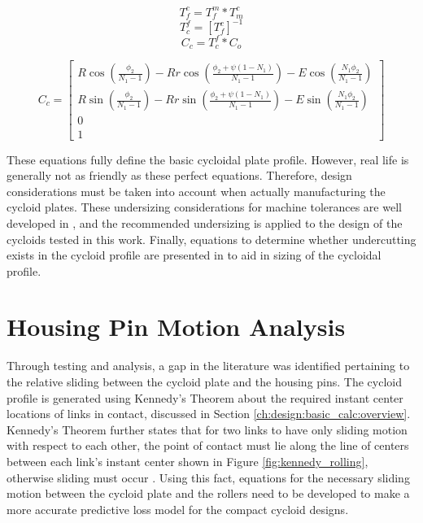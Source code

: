 \begin{equation} \label{eq:T_fc}
T_f^c = T_f^m * T_m^c 
\end{equation}
\begin{equation} \label{eq:T_cf}
T_c^f = \left[{T_f^c}\right]^{-1}
\end{equation}
\begin{equation} \label{eq:Cc}
C_c = T_c^f * C_o
\end{equation}

\begin{equation} \label{eq:single_profile}
C_c = \left[\begin{array}{c}
		R\cos(\frac{\phi_2}{N_1 -1}) - Rr\cos(\frac{\phi_2 + \psi(1-N_1)}{N_1-1}) - E\cos(\frac{N_1\phi_2}{N_1-1})\\
		R\sin(\frac{\phi_2}{N_1 -1}) - Rr\sin(\frac{\phi_2 + \psi(1-N_1)}{N_1-1}) - E\sin(\frac{N_1\phi_2}{N_1-1})\\
		0\\
		1
		\end{array} \right]
\end{equation}

These equations fully define the basic cycloidal plate profile. However, real life is generally not as friendly as these perfect equations. Therefore, design considerations must be taken into account when actually manufacturing the cycloid plates. These undersizing considerations for machine tolerances are well developed in \cite{ref:design_and_application}, and the recommended undersizing is applied to the design of the cycloids tested in this work. Finally, equations to determine whether undercutting exists in the cycloid profile are presented in \cite{ref:ye} to aid in sizing of the cycloidal profile. 




\section{Housing Pin Motion Analysis} \label{ch:design:pin_roll_1s}

Through testing and analysis, a gap in the literature was identified pertaining to the relative sliding between the cycloid plate and the housing pins. The cycloid profile is generated using Kennedy's Theorem about the required instant center locations of links in contact, discussed in Section \ref{ch:design:basic_calc:overview}. Kennedy's Theorem further states that for two links to have only sliding motion with respect to each other, the point of contact must lie along the line of centers between each link's instant center shown in Figure \ref{fig:kennedy_rolling}, otherwise sliding must occur \cite{ref:kinematics_and_dynamics}. Using this fact, equations for the necessary sliding motion between the cycloid plate and the rollers need to be developed to make a more accurate predictive loss model for the compact cycloid designs.

